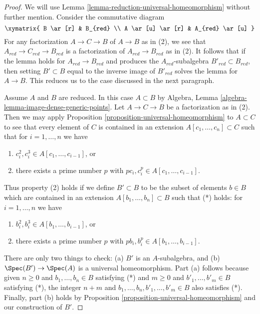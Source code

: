 \begin{proof}
We will use Lemma \ref{lemma-reduction-universal-homeomorphism}
without further mention. Consider the commutative diagram
$$
\xymatrix{
B \ar[r] & B_{red} \\
A \ar[u] \ar[r] & A_{red} \ar[u]
}
$$
For any factorization $A \to C \to B$ of $A \to B$ as in (2), we see
that $A_{red} \to C_{red} \to B_{red}$ is a factorization of
$A_{red} \to B_{red}$ as in (2). It follows that if the
lemma holds for $A_{red} \to B_{red}$ and produces the $A_{red}$-subalgebra
$B'_{red} \subset B_{red}$, then setting $B' \subset B$
equal to the inverse image of $B'_{red}$ solves the lemma for
$A \to B$. This reduces us to the case discussed in the next paragraph.

\medskip\noindent
Assume $A$ and $B$ are reduced. In this case $A \subset B$ by
Algebra, Lemma \ref{algebra-lemma-image-dense-generic-points}.
Let $A \to C \to B$ be a factorization as in (2).
Then we may apply Proposition \ref{proposition-universal-homeomorphism}
to $A \subset C$ to see that every element of $C$ is contained
in an extension $A[c_1, \ldots, c_n] \subset C$ such that for
$i = 1, \ldots, n$ we have
\begin{enumerate}
\item $c_i^2, c_i^3 \in A[c_1, \ldots, c_{i - 1}]$, or
\item there exists a prime number $p$ with
$pc_i, c_i^p \in A[c_1, \ldots, c_{i - 1}]$.
\end{enumerate}
Thus property (2) holds if we define $B' \subset B$ to be the
subset of elements $b \in B$ which are contained in an extension
$
A[b_1, \ldots, b_n] \subset B
$
such that (*) holds: for $i = 1, \ldots, n$ we have
\begin{enumerate}
\item $b_i^2, b_i^3 \in A[b_1, \ldots, b_{i - 1}]$, or
\item there exists a prime number $p$ with
$pb_i, b_i^p \in A[b_1, \ldots, b_{i - 1}]$.
\end{enumerate}
There are only two things to check: (a) $B'$ is an $A$-subalgebra, and
(b) $\Spec(B') \to \Spec(A)$ is a universal homeomorphism.
Part (a) follows because given $n \geq 0$ and $b_1, \ldots, b_n \in B$
satisfying (*) and $m \geq 0$ and $b'_1, \ldots, b'_m \in B$
satisfying (*), the integer
$n + m$ and $b_1, \ldots, b_n, b'_1, \ldots, b'_m \in B$
also satisfies (*). Finally, part (b) holds by
Proposition \ref{proposition-universal-homeomorphism} and our construction
of $B'$.
\end{proof}


